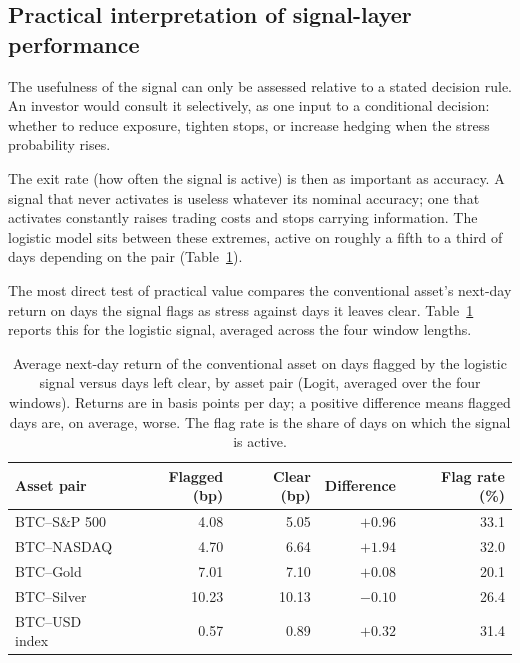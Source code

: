 \subsection{Practical interpretation of signal-layer performance}

The usefulness of the signal can only be assessed relative to a stated decision rule. An investor would consult it selectively, as one input to a conditional decision: whether to reduce exposure, tighten stops, or increase hedging when the stress probability rises.

The exit rate (how often the signal is active) is then as important as accuracy. A signal that never activates is useless whatever its nominal accuracy; one that activates constantly raises trading costs and stops carrying information. The logistic model sits between these extremes, active on roughly a fifth to a third of days depending on the pair (Table~\ref{tab:signal_returns}).

The most direct test of practical value compares the conventional asset's next-day return on days the signal flags as stress against days it leaves clear. Table~\ref{tab:signal_returns} reports this for the logistic signal, averaged across the four window lengths.

\begin{table}[H]
    \centering
    \caption{Average next-day return of the conventional asset on days flagged by the logistic signal versus days left clear, by asset pair (Logit, averaged over the four windows). Returns are in basis points per day; a positive difference means flagged days are, on average, worse. The flag rate is the share of days on which the signal is active.}
    \label{tab:signal_returns}
    \begin{tabular}{lrrrr}
        \toprule
        Asset pair & Flagged (bp) & Clear (bp) & Difference & Flag rate (\%) \\
        \midrule
        BTC--S\&P 500  & 4.08 & 5.05 & $+0.96$ & 33.1 \\
        BTC--NASDAQ    & 4.70 & 6.64 & $+1.94$ & 32.0 \\
        BTC--Gold      & 7.01 & 7.10 & $+0.08$ & 20.1 \\
        BTC--Silver    & 10.23 & 10.13 & $-0.10$ & 26.4 \\
        BTC--USD index & 0.57 & 0.89 & $+0.32$ & 31.4 \\
        \bottomrule
    \end{tabular}
\end{table}

